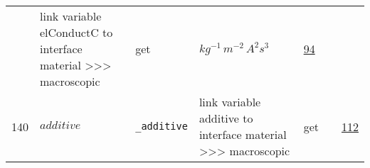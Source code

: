 \begin{longtable}{|p{1cm}|p{2.5cm}|p{4.5cm}|p{8cm}|p{3.0cm}|p{3cm}|p{1cm}|}
             & link variable elConductC to interface material >>> macroscopic
             & \begin{lay}get \end{lay}
             & $ kg^{-1} \,m^{-2} \,A^{2} s^{3} \, $
             & \hyperlink{"e:94"}{ 94 }
                 \\
    140
             & \hypertarget{"v:140"}{ $ {additive}{_{}} $}
             & \verb|_additive|
             & link variable additive to interface material >>> macroscopic
             & \begin{lay}get \end{lay}
             & $  $
             & \hyperlink{"e:112"}{ 112 }
                 \\
    \end{longtable}